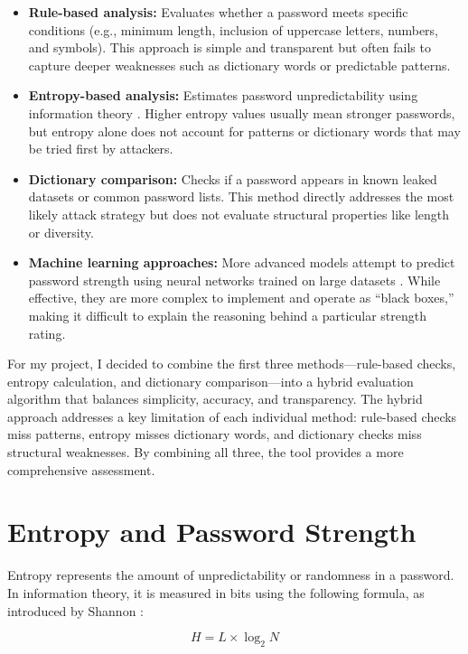 \begin{itemize}
    \item \textbf{Rule-based analysis:} Evaluates whether a password meets specific conditions (e.g., minimum length, inclusion of uppercase letters, numbers, and symbols). This approach is simple and transparent but often fails to capture deeper weaknesses such as dictionary words or predictable patterns.
    \item \textbf{Entropy-based analysis:} Estimates password unpredictability using information theory \cite{shannon1948}. Higher entropy values usually mean stronger passwords, but entropy alone does not account for patterns or dictionary words that may be tried first by attackers.
    \item \textbf{Dictionary comparison:} Checks if a password appears in known leaked datasets or common password lists. This method directly addresses the most likely attack strategy but does not evaluate structural properties like length or diversity.
    \item \textbf{Machine learning approaches:} More advanced models attempt to predict password strength using neural networks trained on large datasets \cite{melcher2016, castelluccia2012}. While effective, they are more complex to implement and operate as ``black boxes,'' making it difficult to explain the reasoning behind a particular strength rating.
\end{itemize}

For my project, I decided to combine the first three methods---rule-based checks, entropy calculation, and dictionary comparison---into a hybrid evaluation algorithm that balances simplicity, accuracy, and transparency. The hybrid approach addresses a key limitation of each individual method: rule-based checks miss patterns, entropy misses dictionary words, and dictionary checks miss structural weaknesses. By combining all three, the tool provides a more comprehensive assessment.


\section{Entropy and Password Strength}

Entropy represents the amount of unpredictability or randomness in a password. In information theory, it is measured in bits using the following formula, as introduced by Shannon \cite{shannon1948}:

\begin{equation}
H = L \times \log_2 N
\end{equation}

